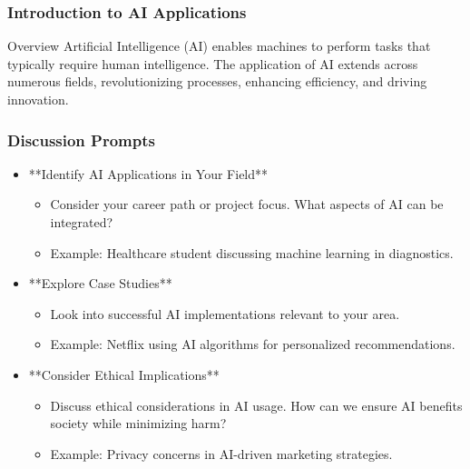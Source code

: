\documentclass[aspectratio=169]{beamer}
\begin{document}
\begin{frame}[fragile]
    \frametitle{Introduction to AI Applications}
    \begin{block}{Overview}
        Artificial Intelligence (AI) enables machines to perform tasks that typically require human intelligence. The application of AI extends across numerous fields, revolutionizing processes, enhancing efficiency, and driving innovation.
    \end{block}
\end{frame}

\begin{frame}[fragile]
    \frametitle{Discussion Prompts}
    \begin{itemize}
        \item **Identify AI Applications in Your Field** 
            \begin{itemize}
                \item Consider your career path or project focus. What aspects of AI can be integrated?
                \item Example: Healthcare student discussing machine learning in diagnostics.
            \end{itemize}
        
        \item **Explore Case Studies**
            \begin{itemize}
                \item Look into successful AI implementations relevant to your area.
                \item Example: Netflix using AI algorithms for personalized recommendations.
            \end{itemize}
        
        \item **Consider Ethical Implications**
            \begin{itemize}
                \item Discuss ethical considerations in AI usage. How can we ensure AI benefits society while minimizing harm?
                \item Example: Privacy concerns in AI-driven marketing strategies.
            \end{itemize}
    \end{itemize}
\end{frame}
\end{document}
